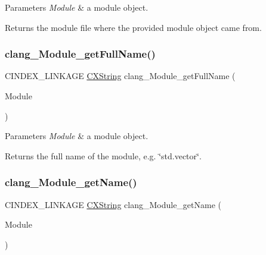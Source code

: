 \begin{DoxyParams}{Parameters}
{\em Module} & a module object.\\
\hline
\end{DoxyParams}
\begin{DoxyReturn}{Returns}
the module file where the provided module object came from. 
\end{DoxyReturn}
\mbox{\label{group__CINDEX__MODULE_ga09d2da739b4bbac05fa2c1ad6695095a}} 
\subsubsection{\texorpdfstring{clang\+\_\+\+Module\+\_\+get\+Full\+Name()}{clang\_Module\_getFullName()}}
{\footnotesize\ttfamily C\+I\+N\+D\+E\+X\+\_\+\+L\+I\+N\+K\+A\+GE \hyperlink{structCXString}{C\+X\+String} clang\+\_\+\+Module\+\_\+get\+Full\+Name (\begin{DoxyParamCaption}\item[{C\+X\+Module}]{Module }\end{DoxyParamCaption})}


\begin{DoxyParams}{Parameters}
{\em Module} & a module object.\\
\hline
\end{DoxyParams}
\begin{DoxyReturn}{Returns}
the full name of the module, e.\+g. \char`\"{}std.\+vector\char`\"{}. 
\end{DoxyReturn}
\mbox{\label{group__CINDEX__MODULE_ga39896de675e90c4fb2de55e109d376a8}} 
\subsubsection{\texorpdfstring{clang\+\_\+\+Module\+\_\+get\+Name()}{clang\_Module\_getName()}}
{\footnotesize\ttfamily C\+I\+N\+D\+E\+X\+\_\+\+L\+I\+N\+K\+A\+GE \hyperlink{structCXString}{C\+X\+String} clang\+\_\+\+Module\+\_\+get\+Name (\begin{DoxyParamCaption}\item[{C\+X\+Module}]{Module }\end{DoxyParamCaption})}


